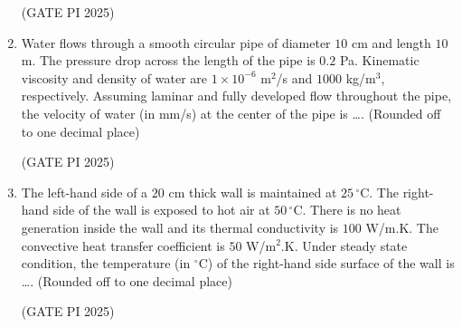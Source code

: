 \documentclass[journal,12pt,onecolumn]{IEEEtran}
\theoremstyle{remark}
\begin{document}
\begin{enumerate}


\hfill (GATE PI 2025)


\item Water flows through a smooth circular pipe of diameter $10$ cm and length $10$ m. The pressure drop across the length of the pipe is $0.2$ Pa. Kinematic viscosity and density of water are $1\times10^{-6}$ m$^{2}$/s and $1000$ kg/m$^{3}$, respectively. Assuming laminar and fully developed flow throughout the pipe, the velocity of water (in mm/s) at the center of the pipe is \dots. (Rounded off to one decimal place)

\hfill (GATE PI 2025)

\item The left-hand side of a $20$ cm thick wall is maintained at $25\,^\circ$C. The right-hand side of the wall is exposed to hot air at $50\,^\circ$C. There is no heat generation inside the wall and its thermal conductivity is $100$ W/m.K. The convective heat transfer coefficient is $50$ W/m$^{2}.$K. Under steady state condition, the temperature (in $^\circ$C) of the right-hand side surface of the wall is \dots. (Rounded off to one decimal place)

\hfill (GATE PI 2025)

\end{enumerate}
\end{document}
